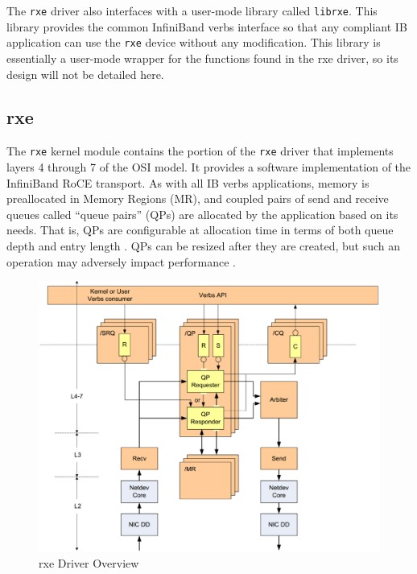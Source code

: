 \documentclass[11pt]{book}
\begin{document}
The \verb;rxe; driver also interfaces with a user-mode library called
\verb;librxe;. This library provides the common InfiniBand verbs
interface so that any compliant IB application can use the \verb;rxe; device
without any modification. This library is essentially a user-mode wrapper for
 the functions found in the rxe driver, so its design will not be detailed here.

\subsection{\textbf{rxe}}
\label{rxe}

The \verb;rxe; kernel module contains the portion of the \verb;rxe; driver that
implements layers 4 through 7 of the OSI model. It provides a software
implementation of the InfiniBand RoCE transport. As with all IB
verbs applications, memory is preallocated in Memory Regions (MR), and coupled
pairs of send and receive queues called ``queue pairs'' (QPs) are allocated by
the application based on its needs. That is, QPs are configurable at allocation
time in terms of both queue depth and entry length
\cite{InfiniBandTARoCE-10}\cite{InfiniBandTABase-07}. QPs can be resized after
they are created, but such an operation may adversely impact performance
\cite{InfiniBandTARoCE-10}.

\begin{figure}[h]
\includegraphics[width=\textwidth]{rxe_overview}
\caption{rxe Driver Overview \protect\cite{pearson-10}}
\label{rxe-overview}
\end{figure}
\end{document}
